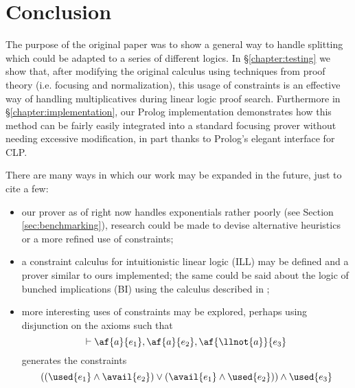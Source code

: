 \chapter{Conclusion}\label{chapter:conclusion}
The purpose of the original paper \cite{HarlandPym} was to show a general way to handle splitting which could be adapted to a series of different logics.
In \S\ref{chapter:testing} we show that, after modifying the original calculus using techniques from proof theory (i.e. focusing \cite{Focusing} and normalization), this usage of constraints is an effective way of handling multiplicatives during linear logic proof search.
Furthermore in \S\ref{chapter:implementation}, our Prolog implementation demonstrates how this method can be fairly easily integrated into a standard focusing prover without needing excessive modification, in part thanks to Prolog's elegant interface for CLP.

There are many ways in which our work may be expanded in the future, just to cite a few:
\begin{itemize}
	\item our prover as of right now handles exponentials rather poorly (see Section \ref{sec:benchmarking}), research could be made to devise alternative heuristics or a more refined use of constraints;
	\item a constraint calculus for intuitionistic linear logic (ILL) may be defined and a prover similar to ours implemented; the same could be said about the logic of bunched implications (BI) using the calculus described in \cite{HarlandPym};
	\item more interesting uses of constraints may be explored, perhaps using disjunction on the axioms such that
		$$ \vdash \af{a}{e_1}, \af{a}{e_2}, \af{\llnot{a}}{e_3} $$
	generates the constraints
		$$ ((\used{e_1} \wedge \avail{e_2}) \vee (\avail{e_1} \wedge \used{e_2})) \wedge \used{e_3} $$
\end{itemize}
